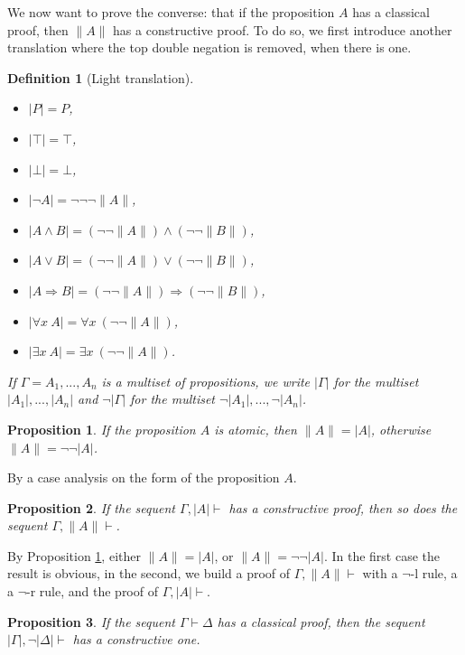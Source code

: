 \documentclass{article}
\newcommand{\fa}{\forall}
\newcommand{\ex}{\exists}
\newtheorem{definition}{Definition}
\newtheorem{proposition}{Proposition}
\begin{document}
We now want to prove the converse: that if the proposition $A$ has a 
classical proof, then $\|A\|$ has a constructive proof.
To do so, we first introduce another translation where the top double
negation is removed, when there is one.
\begin{definition}[Light translation]~
\begin{itemize}
\item $|P| = P$,
\item $|\top| = \top$,
\item $|\bot| = \bot$,
\item $|\neg A| = \neg \neg \neg \|A\|$, 
\item $|A \wedge B| = (\neg \neg \|A\|) \wedge (\neg \neg \|B\|)$,
\item $|A \vee B| = (\neg \neg \|A\|) \vee (\neg \neg \|B\|)$,
\item $|A \Rightarrow B| = (\neg \neg \|A\|) \Rightarrow (\neg \neg \|B\|)$,
\item $|\fa x~A| = \fa x~(\neg \neg \|A\|)$,
\item $|\ex x~A| = \ex x~(\neg \neg \|A\|)$.
\end{itemize}
If $\Gamma = A_1, ..., A_n$ is a multiset of propositions, we write 
$|\Gamma|$ for the multiset $|A_1|, ..., |A_n|$ and 
$\neg |\Gamma|$ for the multiset $\neg |A_1|, ..., \neg |A_n|$. 
\end{definition}

\begin{proposition}\label{notnot}
If the proposition $A$ is atomic, then $\|A\| = |A|$, otherwise 
$\|A\| = \neg \neg |A|$. 
\end{proposition}

By a case analysis on the form of the proposition $A$.

\begin{proposition}\label{oneandtheother}
If the sequent $\Gamma, |A| \vdash$ has a constructive proof, 
then so does the sequent $\Gamma, \|A\| \vdash$.
\end{proposition}

By Proposition \ref{notnot}, either $\|A\| = |A|$, or
$\|A\| = \neg \neg |A|$. In the first case the result is obvious, 
in the second, we build a proof of $\Gamma, \|A\| \vdash$ with 
a $\neg$-l rule, a a $\neg$-r rule, and the proof of $\Gamma, |A| \vdash$.

\begin{proposition}\label{key}
If the sequent $\Gamma \vdash \Delta$ has a classical
proof, then the sequent 
$|\Gamma|, \neg |\Delta| \vdash$
has a constructive one.
\end{proposition}
\end{document}
